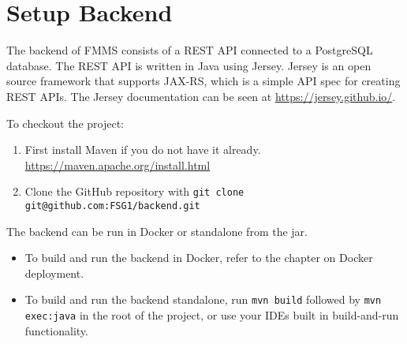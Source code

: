 \chapter{Setup Backend}
\label{ch:backend}

The backend of FMMS consists of a REST API connected to a PostgreSQL database. The REST API is written in Java using Jersey. Jersey is an open source framework that supports JAX-RS, which is a simple API spec for creating REST APIs. The Jersey documentation can be seen at \url{https://jersey.github.io/}.

To checkout the project:
\begin{enumerate}
	\item First install Maven if you do not have it already. \\ 
	\url{https://maven.apache.org/install.html}
	\item Clone the GitHub repository with \texttt{git clone git@github.com:FSG1/backend.git}
\end{enumerate}

The backend can be run in Docker or standalone from the jar.
\begin{itemize}
	\item To build and run the backend in Docker, refer to the chapter on Docker deployment.
	\item To build and run the backend standalone, run \texttt{mvn build} followed by \texttt{mvn exec:java} in the root of the project, or use your IDEs built in build-and-run functionality.	
\end{itemize}